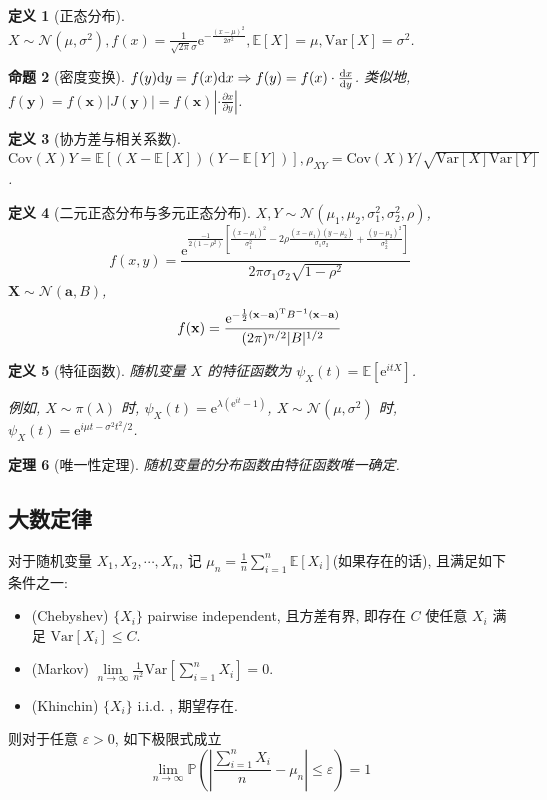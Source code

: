 \documentclass[8pt]{article}
\theoremstyle{compact}
\newtheorem{theorem}{定理}
\newtheorem{definition}[theorem]{定义}
\newtheorem{proposition}[theorem]{命题}
\def\le{\leqslant}
\def\P#1{\mathbb{P}\left({#1}\right)}
\def\e{\mathrm{e}}
\def\E#1{\mathbb{E}\left[{#1}\right]}
\def\Var#1{\text{Var}\left[{#1}\right]}
\def\Cov#1{\text{Cov}\left({#1}\right)}
\begin{document}
\begin{definition}[正态分布]
	$X \sim \mathcal N(\mu, \sigma^2), f(x) = \frac{1}{\sqrt{2\pi}\sigma}\e^{-\frac{(x - \mu)^2}{2\sigma^2}}, \E{X} = \mu, \Var{X} = \sigma^2$.
\end{definition}
\begin{proposition}[密度变换]
	$f(y)\text dy = f(x)\text dx \Rightarrow f(y) = f(x) \cdot \frac{\text dx}{\text dy}$. 类似地, $f(\mathbf y) = f(\mathbf x)|J(\mathbf y)| = f(\mathbf x)|\cdot\frac{\partial x}{\partial y}|$.
\end{proposition}
\begin{definition}[协方差与相关系数]
	$\Cov{X}{Y} = \E{(X - \E{X})(Y - \E{Y})}, \rho_{XY} = \Cov{X}{Y} / \sqrt{\Var{X}\Var{Y}}$.
\end{definition}
\begin{definition}[二元正态分布与多元正态分布] $X, Y \sim \mathcal N(\mu_1, \mu_2, \sigma_1^2, \sigma_2^2, \rho)$, 
	$$f(x, y) = \frac{\e^{\frac{-1}{2(1-\rho^2)}\left[\frac{(x-\mu_1)^2}{\sigma_1^2} - 2\rho\frac{(x-\mu_1)(y-\mu_2)}{\sigma_1\sigma_2} + \frac{(y-\mu_2)^2}{\sigma_2^2}\right]}}{2\pi\sigma_1\sigma_2\sqrt{1-\rho^2}}$$
	$\mathbf X \sim \mathcal N(\mathbf a, B)$, $$f(\mathbf x) = \frac{\e^{-\frac12(\mathbf x - \mathbf a)^{\text T}B^{-1}(\mathbf x - \mathbf a)}}{(2\pi)^{n/2}|B|^{1/2}}$$
\end{definition}

\begin{definition}[特征函数]
	随机变量 $X$ 的特征函数为 $\psi_X(t) = \E{\e^{itX}}$.

	例如, $X \sim \pi(\lambda)$ 时, $\psi_X(t) = \e^{\lambda(\e^{it} - 1)}$, $X \sim \mathcal N(\mu, \sigma^2)$ 时, $\psi_X(t) = \e^{i\mu t - \sigma^2t^2/2}$.
\end{definition}

\begin{theorem}[唯一性定理]
	随机变量的分布函数由特征函数唯一确定.
\end{theorem}

\subsection{大数定律}
对于随机变量 $X_1, X_2, \cdots, X_n$, 记 $\mu_n = \frac1n\sum\limits_{i=1}^{n}\E{X_i}$(如果存在的话), 且满足如下条件之一:
\begin{itemize}
	\item (Chebyshev) $\{X_i\}$ pairwise independent, 且方差有界, 即存在 $C$ 使任意 $X_i$ 满足 $\Var{X_i} \le C$.
	\item (Markov) $\lim\limits_{n \to \infty}\frac{1}{n^2}\Var{\sum\limits_{i=1}^{n}X_i} = 0$.
	\item (Khinchin) $\{X_i\}$ i.i.d. , 期望存在.
\end{itemize}
则对于任意 $\varepsilon > 0$, 如下极限式成立 $$\lim_{n \to \infty}\P{\left|\frac{\sum_{i=1}^{n}X_i}{n} - \mu_n\right| \le \varepsilon} = 1$$
\end{document}
